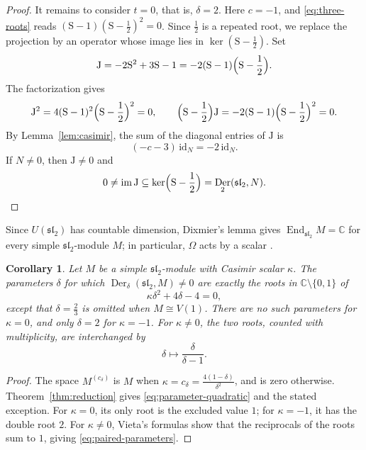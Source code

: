 \documentclass[11pt,reqno]{amsart}
\numberwithin{equation}{section}
\newcommand{\C}{\mathbb C}
\newcommand{\s}{\mathfrak{sl}_2}
\DeclareMathOperator{\Der}{Der}
\DeclareMathOperator{\End}{End}
\DeclareMathOperator{\im}{im}
\newtheorem{corollary}[theorem]{Corollary}
\theoremstyle{definition}
\theoremstyle{remark}
\begin{document}
\begin{proof}
It remains to consider \(t=0\), that is, \(\delta=2\).
Here \(c=-1\), and \eqref{eq:three-roots} reads
\((\mathrm{S}-1)(\mathrm{S}-\frac{1}{2})^2=0\).
Since \(\frac{1}{2}\) is a repeated root, we replace the projection
by an operator whose image lies in \(\ker(\mathrm{S}-\frac{1}{2})\).
Set
\begin{equation}\label{eq:nilpotent-operator}
\mathrm{J}=-2\mathrm{S}^2+3\mathrm{S}-1
=-2(\mathrm{S}-1)\Bigl(\mathrm{S}-\frac{1}{2}\Bigr).
\end{equation}
The factorization gives
\[
\mathrm{J}^2=4(\mathrm{S}-1)^2\Bigl(\mathrm{S}-\frac{1}{2}\Bigr)^2=0,\qquad
\Bigl(\mathrm{S}-\frac{1}{2}\Bigr)\mathrm{J}
=-2(\mathrm{S}-1)\Bigl(\mathrm{S}-\frac{1}{2}\Bigr)^2=0.
\]
By Lemma~\ref{lem:casimir}, the sum of the diagonal entries
of \(\mathrm{J}\) is
\[
(-c-3)\,\mathrm{id}_N=-2\,\mathrm{id}_N.
\]
If \(N\ne0\), then \(\mathrm{J}\ne0\) and
\[
0\ne\im \mathrm{J}\subseteq
\ker\Bigl(\mathrm{S}-\frac{1}{2}\Bigr)=\Der_2(\s,N).\qedhere
\]
\end{proof}

Since \(U(\s)\) has countable dimension, Dixmier's lemma gives
\(\End_{\s}M=\C\) for every simple \(\s\)-module \(M\);
in particular, \(\Omega\) acts by a scalar \cite{Maz10}.

\begin{corollary}\label{cor:admissible-parameters}
Let \(M\) be a simple \(\s\)-module with Casimir scalar \(\kappa\).
The parameters \(\delta\) for which \(\Der_\delta(\s,M)\ne0\)
are exactly the roots in \(\C\setminus\{0,1\}\) of
\begin{equation}\label{eq:parameter-quadratic}
\kappa\delta^2+4\delta-4=0,
\end{equation}
except that \(\delta=\frac{2}{3}\) is omitted when \(M\cong V(1)\).
There are no such parameters for \(\kappa=0\), and only
\(\delta=2\) for \(\kappa=-1\).
For \(\kappa\ne0\), the two roots, counted with multiplicity,
are interchanged by
\begin{equation}\label{eq:paired-parameters}
\delta\longmapsto\frac{\delta}{\delta-1}.
\end{equation}
\end{corollary}
\begin{proof}
The space \(M^{(c_\delta)}\) is \(M\) when
\(\kappa=c_\delta=\frac{4(1-\delta)}{\delta^2}\), and is zero otherwise.
Theorem~\ref{thm:reduction} gives \eqref{eq:parameter-quadratic}
and the stated exception. For \(\kappa=0\), its only root is the excluded
value \(1\); for \(\kappa=-1\), it has the double root \(2\).
For \(\kappa\ne0\), Vieta's formulas show that the reciprocals of the
roots sum to \(1\), giving \eqref{eq:paired-parameters}.
\end{proof}
\end{document}
